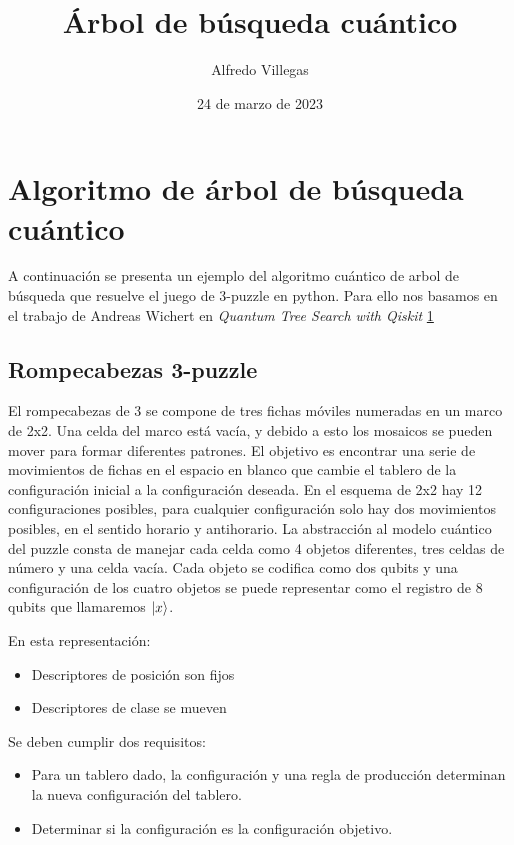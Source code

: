 \documentclass[11pt]{article}
\title{Árbol de búsqueda cuántico}
\author{Alfredo Villegas}
\date{24 de marzo de 2023}
\providecommand{\tightlist}{%
      \setlength{\itemsep}{0pt}\setlength{\parskip}{0pt}}
\begin{document}
    
    \maketitle
    
    

    
    \hypertarget{algoritmo-de-uxe1rbol-de-buxfasqueda-cuuxe1ntico}{%
\section{Algoritmo de árbol de búsqueda
cuántico}\label{algoritmo-de-uxe1rbol-de-buxfasqueda-cuuxe1ntico}}

A continuación se presenta un ejemplo del algoritmo cuántico de arbol de
búsqueda que resuelve el juego de 3-puzzle en python. Para ello nos
basamos en el trabajo de Andreas Wichert en \emph{Quantum Tree Search
with Qiskit} \href{https://doi.org/10.3390/math10173103}{1}

    \hypertarget{rompecabezas-3-puzzle}{%
\subsection{Rompecabezas 3-puzzle}\label{rompecabezas-3-puzzle}}

El rompecabezas de 3 se compone de tres fichas móviles numeradas en un
marco de 2x2. Una celda del marco está vacía, y debido a esto los
mosaicos se pueden mover para formar diferentes patrones. El objetivo es
encontrar una serie de movimientos de fichas en el espacio en blanco que
cambie el tablero de la configuración inicial a la configuración
deseada. En el esquema de 2x2 hay 12 configuraciones posibles, para
cualquier configuración solo hay dos movimientos posibles, en el sentido
horario y antihorario. La abstracción al modelo cuántico del puzzle
consta de manejar cada celda como 4 objetos diferentes, tres celdas de
número y una celda vacía. Cada objeto se codifica como dos qubits y una
configuración de los cuatro objetos se puede representar como el
registro de 8 qubits que llamaremos \(\ket{x}\).

En esta representación:

\begin{itemize}
\tightlist
\item
  Descriptores de posición son fijos
\item
  Descriptores de clase se mueven
\end{itemize}

Se deben cumplir dos requisitos:

\begin{itemize}
\tightlist
\item
  Para un tablero dado, la configuración y una regla de producción
  determinan la nueva configuración del tablero.
\item
  Determinar si la configuración es la configuración objetivo.
\end{itemize}
\end{document}
